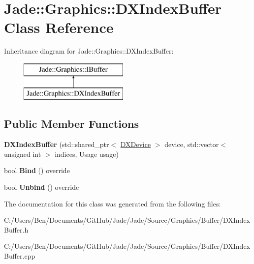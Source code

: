 \hypertarget{class_jade_1_1_graphics_1_1_d_x_index_buffer}{}\section{Jade\+:\+:Graphics\+:\+:D\+X\+Index\+Buffer Class Reference}
\label{class_jade_1_1_graphics_1_1_d_x_index_buffer}
Inheritance diagram for Jade\+:\+:Graphics\+:\+:D\+X\+Index\+Buffer\+:\begin{figure}[H]
\begin{center}
\leavevmode
\includegraphics[height=2.000000cm]{class_jade_1_1_graphics_1_1_d_x_index_buffer}
\end{center}
\end{figure}
\subsection*{Public Member Functions}
\begin{DoxyCompactItemize}
\item 
\hypertarget{class_jade_1_1_graphics_1_1_d_x_index_buffer_a08a6139aac74ad88a0b09629f2001df1}{}{\bfseries D\+X\+Index\+Buffer} (std\+::shared\+\_\+ptr$<$ \hyperlink{class_jade_1_1_graphics_1_1_d_x_device}{D\+X\+Device} $>$ device, std\+::vector$<$ unsigned int $>$ indices, Usage usage)\label{class_jade_1_1_graphics_1_1_d_x_index_buffer_a08a6139aac74ad88a0b09629f2001df1}

\item 
\hypertarget{class_jade_1_1_graphics_1_1_d_x_index_buffer_ada73fe7389f0acf531c4f60fdc654e4f}{}bool {\bfseries Bind} () override\label{class_jade_1_1_graphics_1_1_d_x_index_buffer_ada73fe7389f0acf531c4f60fdc654e4f}

\item 
\hypertarget{class_jade_1_1_graphics_1_1_d_x_index_buffer_a49279215e18938d40ac63a1587caa6b3}{}bool {\bfseries Unbind} () override\label{class_jade_1_1_graphics_1_1_d_x_index_buffer_a49279215e18938d40ac63a1587caa6b3}

\end{DoxyCompactItemize}


The documentation for this class was generated from the following files\+:\begin{DoxyCompactItemize}
\item 
C\+:/\+Users/\+Ben/\+Documents/\+Git\+Hub/\+Jade/\+Jade/\+Source/\+Graphics/\+Buffer/D\+X\+Index\+Buffer.\+h\item 
C\+:/\+Users/\+Ben/\+Documents/\+Git\+Hub/\+Jade/\+Jade/\+Source/\+Graphics/\+Buffer/D\+X\+Index\+Buffer.\+cpp\end{DoxyCompactItemize}

